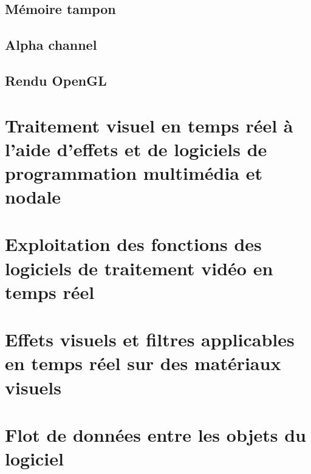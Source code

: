 \documentclass[
]{book}
\begin{document}
\hypertarget{muxe9moire-tampon}{%
\subsection{Mémoire tampon}\label{muxe9moire-tampon}}

\hypertarget{alpha-channel}{%
\subsection{Alpha channel}\label{alpha-channel}}

\hypertarget{rendu-opengl}{%
\subsection{Rendu OpenGL}\label{rendu-opengl}}

\hypertarget{traitement-visuel-en-temps-ruxe9el-uxe0-laide-deffets-et-de-logiciels-de-programmation-multimuxe9dia-et-nodale}{%
\section{Traitement visuel en temps réel à l'aide d'effets et de logiciels de programmation multimédia et nodale}\label{traitement-visuel-en-temps-ruxe9el-uxe0-laide-deffets-et-de-logiciels-de-programmation-multimuxe9dia-et-nodale}}

\hypertarget{exploitation-des-fonctions-des-logiciels-de-traitement-viduxe9o-en-temps-ruxe9el}{%
\section{Exploitation des fonctions des logiciels de traitement vidéo en temps réel}\label{exploitation-des-fonctions-des-logiciels-de-traitement-viduxe9o-en-temps-ruxe9el}}

\hypertarget{effets-visuels-et-filtres-applicables-en-temps-ruxe9el-sur-des-matuxe9riaux-visuels}{%
\section{Effets visuels et filtres applicables en temps réel sur des matériaux visuels}\label{effets-visuels-et-filtres-applicables-en-temps-ruxe9el-sur-des-matuxe9riaux-visuels}}

\hypertarget{flot-de-donnuxe9es-entre-les-objets-du-logiciel}{%
\section{Flot de données entre les objets du logiciel}\label{flot-de-donnuxe9es-entre-les-objets-du-logiciel}}
\end{document}

